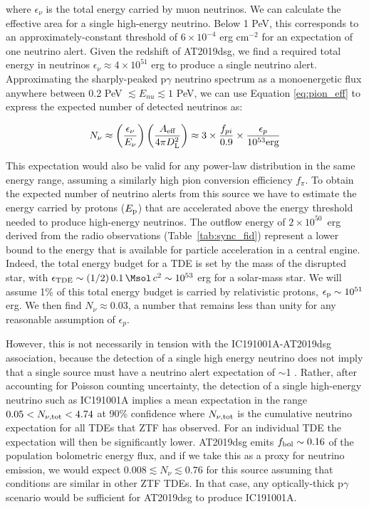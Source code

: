 where $\epsilon_{\nu}$ is the total energy carried by muon neutrinos. We can calculate the effective area for a single high-energy neutrino. Below 1 PeV, this corresponds to an approximately-constant threshold of $6 \times 10^{-4}$ erg cm$^{-2}$ for an expectation of one neutrino alert. Given the redshift of AT2019dsg, we find a required total energy in neutrinos $\epsilon_{\nu} \approx 4 \times 10^{51}$ erg to produce a single neutrino alert. 
Approximating the sharply-peaked p$\gamma$ neutrino spectrum as a monoenergetic flux anywhere between  0.2 PeV $\lesssim E_{nu} \lesssim 1$ PeV, we can use Equation \ref{eq:pion_eff} to express the expected number of detected neutrinos as:

\begin{equation}
N_\nu \approx  \left(\frac{\epsilon_{\nu} }{E_\nu}\right)\left(\frac{A_{  \textup{eff}}} {4\pi D_{  \textup{L}}^{2}}\right) \approx 3 \times \frac{f_{pi}}{0.9} \times \frac{\epsilon_{p}}{10^{53}  \textup{erg}} 
\end{equation} 

This expectation would also be valid for any power-law distribution in the same energy range, assuming a similarly high pion conversion efficiency $f_{\pi}$. To obtain the expected number of neutrino alerts from this source we have to estimate the energy carried by protons ($E_{\textup{p}}$) that are accelerated above the energy threshold needed to produce high-energy neutrinos. The outflow energy of $2 \times 10^{50}$~erg derived from the radio observations (Table~\ref{tab:sync_fid}) represent a lower bound to the energy that is available for particle acceleration in a central engine.  Indeed, the total energy budget for a TDE is set by the mass of the disrupted star, with $\epsilon_{\textup{TDE}} \sim (1/2)\, 0.1 \, \Msol \, c^{2} \sim 10^{53}$ erg for a solar-mass star. We will assume 1\% of this total energy budget is carried by relativistic protons, $\epsilon_{\textup{p}} \sim 10^{51}$ erg. We then find $N_\nu \approx 0.03$, a number that remains less than unity for any reasonable assumption of $\epsilon_{p}$. 

However, this is not necessarily in tension with the IC191001A-AT2019dsg association, because the detection of a single high energy neutrino does not imply that a  single source must have a neutrino alert expectation of $\sim$1 . Rather, after accounting for Poisson counting uncertainty, the detection of a single high-energy neutrino such as IC191001A implies a mean expectation in the range $0.05 < N_{\nu, \textup{tot}} < 4.74$ at 90\% confidence where $N_{\nu, \textup{tot}}$ is the cumulative neutrino expectation for all TDEs that ZTF has observed. For an individual TDE the expectation will then be significantly lower. AT2019dsg emits $f_{\textup{bol}} \sim 0.16$ of the population bolometric energy flux, and if we take this as a proxy for neutrino emission, we would expect $0.008 \lesssim N_{\nu} \lesssim 0.76$ for this source assuming that conditions are similar in other ZTF TDEs. In that case, any optically-thick p$\gamma$ scenario would be sufficient for AT2019dsg to produce IC191001A. 

